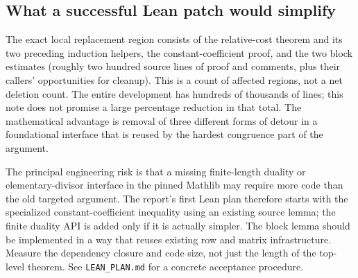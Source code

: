 \documentclass[11pt]{article}
\theoremstyle{remark}\newtheorem{remark}[theorem]{Remark}
\begin{document}
\subsection{What a successful Lean patch would simplify}
The exact local replacement region consists of the relative-cost theorem and its two preceding induction helpers, the constant-coefficient proof, and the two block estimates (roughly two hundred source lines of proof and comments, plus their callers' opportunities for cleanup). This is a count of affected regions, not a net deletion count. The entire development has hundreds of thousands of lines; this note does not promise a large percentage reduction in that total. The mathematical advantage is removal of three different forms of detour in a foundational interface that is reused by the hardest congruence part of the argument.

The principal engineering risk is that a missing finite-length duality or elementary-divisor interface in the pinned Mathlib may require more code than the old targeted argument. The report's first Lean plan therefore starts with the specialized constant-coefficient inequality using an existing source lemma; the finite duality API is added only if it is actually simpler. The block lemma should be implemented in a way that reuses existing row and matrix infrastructure. Measure the dependency closure and code size, not just the length of the top-level theorem. See \texttt{LEAN\_PLAN.md} for a concrete acceptance procedure.
\end{document}

